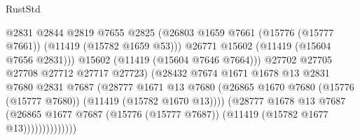\begin{lexlean}{RustStd}
\begin{coremodule}
                                              @2831
                                              @2844
                                              @2819
                                              @7655
                                              @2825
                                              (@26803
                                                @1659
                                                @7661
                                                (@15776 (@15777 @7661))
                                                (@11419 (@15782 @1659 @53)))
                                              @26771
                                              @15602
                                              (@11419 (@15604 @7656 @2831)))
                                            @15602
                                            (@11419 (@15604 @7646 @7664)))
                                          @27702
                                          @27705
                                          @27708
                                          @27712
                                          @27717
                                          @27723)
                                        (@28432
                                          @7674
                                          @1671
                                          @1678
                                          @13
                                          @2831
                                          @7680
                                          @2831
                                          @7687
                                          (@28777
                                            @1671
                                            @13
                                            @7680
                                            (@26865
                                              @1670
                                              @7680
                                              (@15776 (@15777 @7680))
                                              (@11419 (@15782 @1670 @13))))
                                          (@28777
                                            @1678
                                            @13
                                            @7687
                                            (@26865
                                              @1677
                                              @7687
                                              (@15776 (@15777 @7687))
                                              (@11419 (@15782 @1677 @13))))))))))))))

\end{coremodule}
\end{lexlean}

